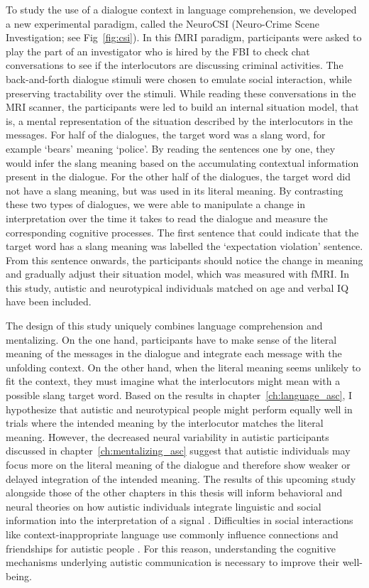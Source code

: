 To study the use of a dialogue context in language comprehension, we developed a new experimental paradigm, called the NeuroCSI (Neuro-Crime Scene Investigation; see Fig~\ref{fig:csi}). In this fMRI paradigm, participants were asked to play the part of an investigator who is hired by the FBI to check chat conversations to see if the interlocutors are discussing criminal activities. The back-and-forth dialogue stimuli were chosen to emulate social interaction, while preserving tractability over the stimuli. While reading these conversations in the MRI scanner, the participants were led to build an internal situation model, that is, a mental representation of the situation described by the interlocutors in the messages. For half of the dialogues, the target word was a slang word, for example `bears' meaning `police'. By reading the sentences one by one, they would infer the slang meaning based on the accumulating contextual information present in the dialogue. For the other half of the dialogues, the target word did not have a slang meaning, but was used in its literal meaning. By contrasting these two types of dialogues, we were able to manipulate a change in interpretation over the time it takes to read the dialogue and measure the corresponding cognitive processes. The first sentence that could indicate that the target word has a slang meaning was labelled the `expectation violation' sentence. From this sentence onwards, the participants should notice the change in meaning and gradually adjust their situation model, which was measured with fMRI. In this study, autistic and neurotypical individuals matched on age and verbal IQ have been included. 


The design of this study uniquely combines language comprehension and mentalizing. On the one hand, participants have to make sense of the literal meaning of the messages in the dialogue and integrate each message with the unfolding context. On the other hand, when the literal meaning seems unlikely to fit the context, they must imagine what the interlocutors might mean with a possible slang target word. Based on the results in chapter~\ref{ch:language_asc}, I hypothesize that autistic and neurotypical people might perform equally well in trials where the intended meaning by the interlocutor matches the literal meaning. However, the decreased neural variability in autistic participants discussed in chapter~\ref{ch:mentalizing_asc} suggest that autistic individuals may focus more on the literal meaning of the dialogue and therefore show weaker or delayed integration of the intended meaning. The results of this upcoming study alongside those of the other chapters in this thesis will inform behavioral and neural theories on how autistic individuals integrate linguistic and social information into the interpretation of a signal \citep{wadge2019}. Difficulties in social interactions like context-inappropriate language use commonly influence connections and friendships for autistic people \citep{howlin2004,bauminger2003,bauminger2000}. For this reason, understanding the cognitive mechanisms underlying autistic communication is necessary to improve their well-being.

